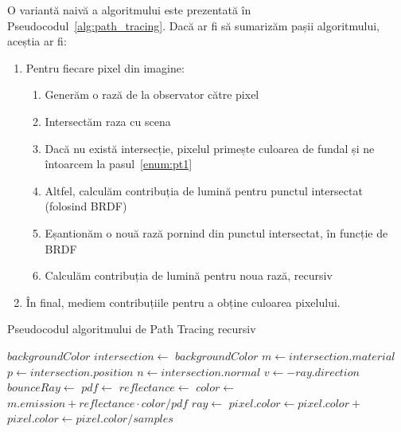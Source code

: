 \documentclass[12pt,a4paper]{report}
\numberwithin{equation}{section} %
\begin{document}
O variantă naivă a algoritmului este prezentată în Pseudocodul~\ref{alg:path_tracing}.
Dacă ar fi să sumarizăm pașii algoritmului, aceștia ar fi:
\begin{enumerate}
	\item Pentru fiecare pixel din imagine: \label{enum:pt1}
	      \begin{enumerate}
		      \item Generăm o rază de la observator către pixel
		      \item Intersectăm raza cu scena
		      \item Dacă nu există intersecție, pixelul primește culoarea de fundal și ne întoarcem la pasul~\ref{enum:pt1}
		      \item Altfel, calculăm contribuția de lumină pentru punctul intersectat (folosind BRDF)
		      \item Eșantionăm o nouă rază pornind din punctul intersectat, în funcție de BRDF
		      \item Calculăm contribuția de lumină pentru noua rază, recursiv
	      \end{enumerate}
	\item În final, mediem contribuțiile pentru a obține culoarea pixelului.
\end{enumerate}

\begin{algorithm}[H]
	\caption{Pseudocodul algoritmului de Path Tracing recursiv}\label{alg:path_tracing}
	\begin{algorithmic}[1]
		\State \Return $backgroundColor$	
		\EndIf
		\State $intersection \gets$  
		\State \Return $backgroundColor$	
		\EndIf
		\State $m \gets intersection.material$
		\State $p \gets intersection.position$
		\State $n \gets intersection.normal$
		\State $v \gets -ray.direction$
		\State $bounceRay \gets$ 	
		\State $pdf \gets$ 		
		\State $reflectance \gets$  
		\State $color \gets$ 	 
		\State \Return $m.emission + reflectance \cdot color / pdf$		 
		\EndFunction
		\State $ray \gets$ 	
		\State $pixel.color \gets pixel.color + $ 	
		\EndFor
		\State $pixel.color \gets pixel.color / samples$ 
		\EndFor
		\EndFunction

	\end{algorithmic}
\end{algorithm}
\end{document}
